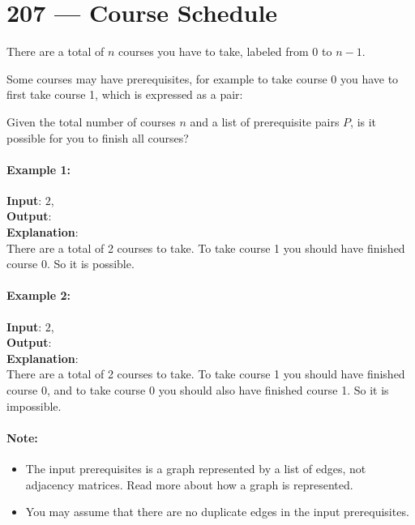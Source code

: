 \section{207 --- Course Schedule}
There are a total of $n$ courses you have to take, labeled from 0 to $n-1$.
\par
Some courses may have prerequisites, for example to take course 0 you have to first take course 1, which is expressed as a pair: \fcj{[0,1]}
\par
Given the total number of courses $n$ and a list of prerequisite pairs $P$, is it possible for you to finish all courses?
\paragraph{Example 1:}
\begin{flushleft}
\textbf{Input}: $2$, \fcj{[[1,0]]}
\\
\textbf{Output}: 
\\
\textbf{Explanation}:
\\
There are a total of 2 courses to take. To take course 1 you should have finished course 0. So it is possible.
\end{flushleft}
\paragraph{Example 2:}
\begin{flushleft}
\textbf{Input}: $2$, \fcj{[[1,0],[0,1]]}
\\
\textbf{Output}: 
\\
\textbf{Explanation}:
\\
There are a total of 2 courses to take. To take course 1 you should have finished course 0, and to take course 0 you should also have finished course 1. So it is impossible.
\end{flushleft}
\paragraph{Note:}
\begin{itemize}
    \item The input prerequisites is a graph represented by a list of edges, not adjacency matrices. Read more about how a graph is represented.
    \item You may assume that there are no duplicate edges in the input prerequisites.
\end{itemize}
